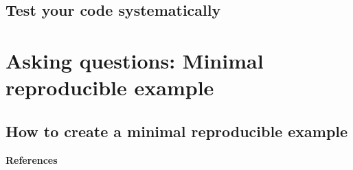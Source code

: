 \documentclass[
]{book}
\begin{document}
\hypertarget{test-your-code-systematically}{%
\subsection{Test your code systematically}\label{test-your-code-systematically}}

\hypertarget{asking-questions-minimal-reproducible-example}{%
\section{Asking questions: Minimal reproducible example}\label{asking-questions-minimal-reproducible-example}}

\hypertarget{how-to-create-a-minimal-reproducible-example}{%
\subsection{How to create a minimal reproducible example}\label{how-to-create-a-minimal-reproducible-example}}

\textbf{References}
\end{document}
